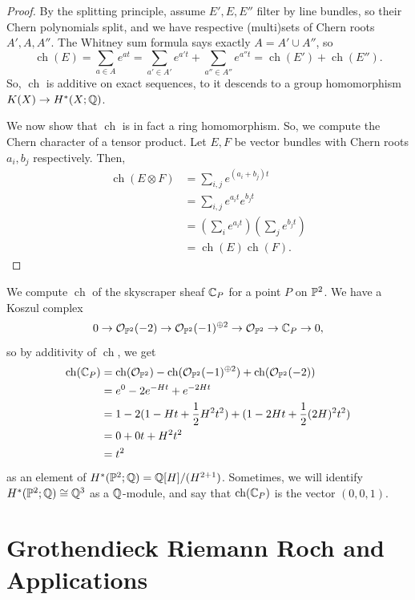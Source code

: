 \documentclass[12pt]{article}
\DeclareMathOperator{\chern}{ch}
\begin{document}
\begin{proof}
    By the splitting principle, assume $E',E,E''$ filter by line bundles, so their Chern polynomials split, and we have respective (multi)sets of Chern roots $A', A, A''$. The Whitney sum formula says exactly $A = A' \cup A''$, so
    \[\chern(E) = \sum_{a\in A} e^{at} = \sum_{a'\in A'} e^{a't} + \sum_{a''\in A''} e^{a''t} = \chern(E') + \chern(E'').\]
    So, $\chern$ is additive on exact sequences, to it descends to a group homomorphism $K(X) \to H^*(X;\Q)$.

    We now show that $\chern$ is in fact a ring homomorphism. So, we compute the Chern character of a tensor product. Let $E,F$ be vector bundles with Chern roots $a_i,b_j$ respectively. Then,
    \begin{align*}
        \chern(E\otimes F) &= \sum_{i,j} e^{(a_i+b_j)t}\\
        &= \sum_{i,j} e^{a_it} e^{b_j t}\\
        &= \left(\sum_i e^{a_i t}\right)\left(\sum_j e^{b_j t}\right)\\
        &= \chern(E) \chern(F).
    \end{align*}
\end{proof}

\begin{eg}\label{skyscraper-on-p2}
    We compute $\chern$ of the skyscraper sheaf $\C_P$ for a point $P$ on $\P^2$. We have a Koszul complex
    \[0 \to \cO_{\P^2}(-2) \to \cO_{\P^2}(-1)^{\oplus 2} \to \cO_{\P^2} \to \C_P \to 0,\]
    so by additivity of $\chern$, we get
    \begin{align*}
        \chern(\C_P) &= \chern(\cO_{\P^2}) - \chern(\cO_{\P^2}(-1)^{\oplus 2}) + \chern(\cO_{\P^2}(-2))\\
        &= e^{0} - 2e^{-Ht} + e^{-2Ht}\\
        &= 1 - 2(1-Ht+\frac{1}{2}H^2 t^2) + (1-2Ht + \frac{1}{2}(2H)^2t^2)\\
        &= 0 + 0t + H^2 t^2\\
        &= t^2
    \end{align*}
    as an element of $H^*(\P^2;\Q) = \Q[H]/(H^{2+1})$. Sometimes, we will identify $H^*(\P^2;\Q)\cong \Q^3$ as a $\Q$-module, and say that $\chern(\C_P)$ is the vector $(0,0,1)$.
\end{eg}



\section{Grothendieck Riemann Roch and Applications}
\end{document}
